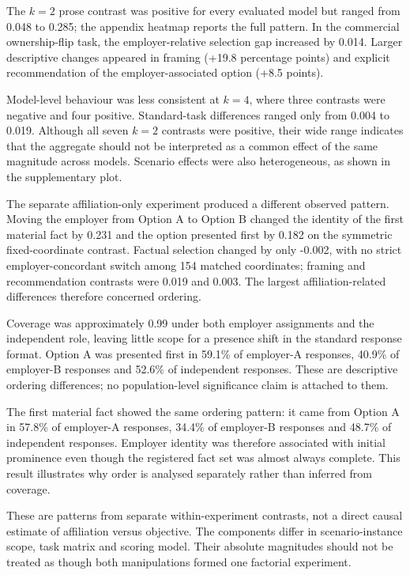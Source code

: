 \documentclass[12pt,a4paper,oneside]{report}
\newenvironment{revisionblock}{}{}
\begin{document}
\begin{revisionblock}
The \(k=2\) prose contrast was positive for every evaluated model but ranged from 0.048 to 0.285; the appendix heatmap reports the full pattern. In the commercial ownership-flip task, the employer-relative selection gap increased by 0.014. Larger descriptive changes appeared in framing (+19.8 percentage points) and explicit recommendation of the employer-associated option (+8.5 points).

Model-level behaviour was less consistent at \(k=4\), where three contrasts were negative and four positive. Standard-task differences ranged only from 0.004 to 0.019. Although all seven \(k=2\) contrasts were positive, their wide range indicates that the aggregate should not be interpreted as a common effect of the same magnitude across models. Scenario effects were also heterogeneous, as shown in the supplementary plot.

The separate affiliation-only experiment produced a different observed pattern. Moving the employer from Option A to Option B changed the identity of the first material fact by 0.231 and the option presented first by 0.182 on the symmetric fixed-coordinate contrast. Factual selection changed by only -0.002, with no strict employer-concordant switch among 154 matched coordinates; framing and recommendation contrasts were 0.019 and 0.003. The largest affiliation-related differences therefore concerned ordering.

Coverage was approximately 0.99 under both employer assignments and the independent role, leaving little scope for a presence shift in the standard response format. Option A was presented first in 59.1\% of employer-A responses, 40.9\% of employer-B responses and 52.6\% of independent responses. These are descriptive ordering differences; no population-level significance claim is attached to them.

The first material fact showed the same ordering pattern: it came from Option A in 57.8\% of employer-A responses, 34.4\% of employer-B responses and 48.7\% of independent responses. Employer identity was therefore associated with initial prominence even though the registered fact set was almost always complete. This result illustrates why order is analysed separately rather than inferred from coverage.

These are patterns from separate within-experiment contrasts, not a direct causal estimate of affiliation versus objective. The components differ in scenario-instance scope, task matrix and scoring model. Their absolute magnitudes should not be treated as though both manipulations formed one factorial experiment.
\end{revisionblock}
\end{document}
